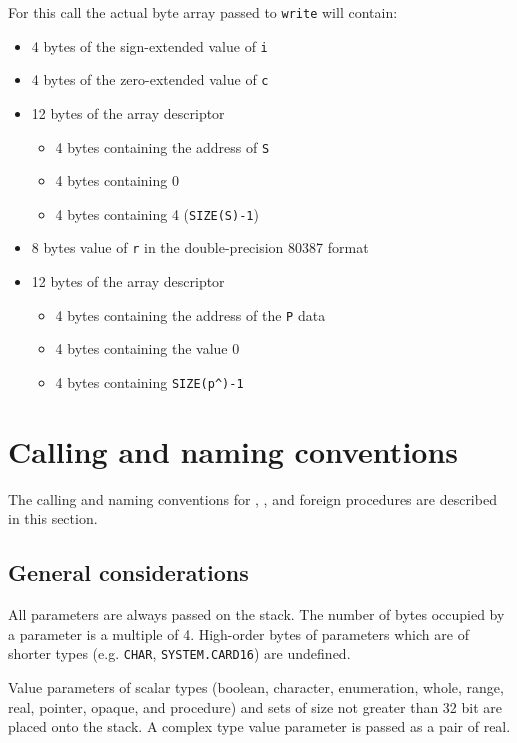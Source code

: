 For this call the actual byte array passed to {\tt write} will contain:
\begin{itemize}
\item  4 bytes of the sign-extended value of {\tt i}
\item  4 bytes of the zero-extended value of {\tt c}
\item  12 bytes of the array descriptor
\begin{itemize}
    \item 4 bytes containing the address of {\tt S}
    \item 4 bytes containing 0
    \item 4 bytes containing 4 (\verb'SIZE(S)-1')
\end{itemize}
\item  8 bytes value of {\tt r} in the double-precision 80387 format
\item  12 bytes of the array descriptor
\begin{itemize}
    \item 4 bytes containing the address of the \verb'P' data
    \item 4 bytes containing the value 0
    \item 4 bytes containing \verb'SIZE(p^)-1'
\end{itemize}
\end{itemize}

\section{Calling and naming conventions}
\label{lowlevel:conv}

The calling and naming conventions for \mt{}, \ot{}, and
foreign procedures are described in this section.

\subsection{General considerations}

All parameters are always passed on the stack. The number of bytes
occupied by a parameter is a multiple of 4. High-order bytes of
parameters which are of shorter types (e.g. \verb'CHAR',
\verb'SYSTEM.CARD16') are undefined.

Value parameters of scalar types (boolean, character, enumeration, whole,
range, real, pointer, opaque, and procedure) and sets of size not
greater than 32 bit are placed onto the stack. A complex type value
parameter is passed as a pair of real.

